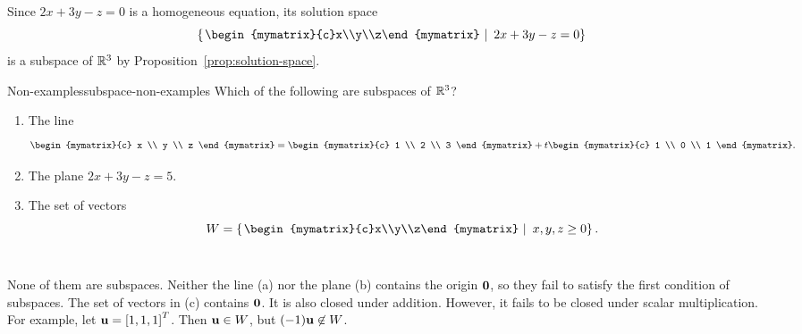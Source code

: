 \begin{solution}
  Since $2x+3y-z=0$ is a homogeneous equation, its solution space
  \begin{equation*}
    \set{\left.\begin{mymatrix}{c}x\\y\\z\end{mymatrix}~\right\vert~ 2x+3y-z=0}
  \end{equation*}
  is a subspace of\/ $\mathbb{R}^3$ by Proposition~\ref{prop:solution-space}.
\end{solution}

\begin{example}{Non-examples}{subspace-non-examples}
  Which of the following are subspaces of\/ $\mathbb{R}^3$?
  \begin{enumialphparenastyle}
    \begin{enumerate}
    \item The line
      \begin{equation*}
        \begin{mymatrix}{c} x \\ y \\ z \end{mymatrix}
        = \begin{mymatrix}{c} 1 \\ 2 \\ 3 \end{mymatrix}
        + t\begin{mymatrix}{c} 1 \\ 0 \\ 1 \end{mymatrix}.
      \end{equation*}
    \item The plane $2x+3y-z=5$.
    \item The set of vectors
      \begin{equation*}
        W=\set{\left.\begin{mymatrix}{c}x\\y\\z\end{mymatrix}
            ~\right\vert~ x,y,z\geq 0}.
      \end{equation*}
      ~
    \end{enumerate}
  \end{enumialphparenastyle}
\end{example}

\begin{solution}
  None of them are subspaces. Neither the line (a) nor the plane (b)
  contains the origin $\vect{0}$, so they fail to satisfy the first
  condition of subspaces. The set of vectors in (c) contains
  $\vect{0}$. It is also closed under addition. However, it fails to
  be closed under scalar multiplication. For example, let
  $\vect{u}=\mat{1,1,1}^T$. Then $\vect{u}\in W$, but
  $(-1)\vect{u}\not\in W$.
\end{solution}

